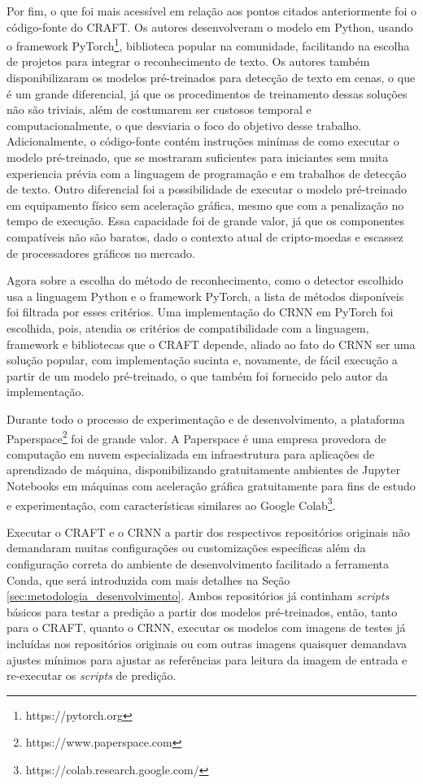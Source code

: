 Por fim, o que foi mais acessível em relação aos pontos citados anteriormente foi o código-fonte do CRAFT. Os autores desenvolveram o modelo em 
Python, usando o framework PyTorch\footnote{https://pytorch.org}, biblioteca popular na comunidade, facilitando na escolha de projetos para 
integrar o reconhecimento de texto. Os autores também disponibilizaram os modelos pré-treinados para detecção de texto em cenas, o que é um 
grande diferencial, já que os procedimentos de treinamento dessas soluções não são triviais, além de costumarem ser custosos temporal 
e computacionalmente, o que desviaria o foco do objetivo desse trabalho. Adicionalmente, o código-fonte contém instruções minímas de como executar 
o modelo pré-treinado, que se mostraram suficientes para iniciantes sem muita experiencia prévia com a linguagem de programação e em trabalhos 
de detecção de texto. Outro diferencial foi a possibilidade de executar o modelo pré-treinado em equipamento físico sem aceleração gráfica, mesmo 
que com a penalização no tempo de execução. Essa capacidade foi de grande valor, já que os componentes compatíveis não são baratos, dado o contexto 
atual de cripto-moedas e escassez de processadores gráficos no mercado.

Agora sobre a escolha do método de reconhecimento, como o detector escolhido usa a linguagem Python e o framework PyTorch, a lista de métodos 
disponíveis foi filtrada por esses critérios. Uma implementação do CRNN em PyTorch foi escolhida, pois, atendia os critérios de compatibilidade 
com a linguagem, framework e bibliotecas que o CRAFT depende, aliado ao fato do CRNN ser uma solução popular, com implementação sucinta e, 
novamente, de fácil execução a partir de um modelo pré-treinado, o que também foi fornecido pelo autor da implementação.

Durante todo o processo de experimentação e de desenvolvimento, a plataforma Paperspace\footnote{https://www.paperspace.com} foi de grande valor. 
A Paperspace é uma empresa provedora de computação em nuvem especializada em infraestrutura para aplicações de aprendizado de máquina, disponibilizando 
gratuitamente ambientes de Jupyter Notebooks em máquinas com aceleração gráfica gratuitamente para fins de estudo e experimentação, com características 
similares ao Google Colab\footnote{https://colab.research.google.com/}.

Executar o CRAFT e o CRNN a partir dos respectivos repositórios originais não demandaram muitas configurações ou customizações específicas além da 
configuração correta do ambiente de desenvolvimento facilitado a ferramenta Conda, que será introduzida com mais detalhes na Seção \ref{sec:metodologia_desenvolvimento}.
 Ambos repositórios já continham \textit{scripts} básicos para testar a predição a partir dos modelos pré-treinados, então, tanto para o CRAFT, 
 quanto o CRNN, executar os modelos com imagens de testes já incluídas nos repositórios originais ou com outras imagens quaisquer demandava ajustes 
 mínimos para ajustar as referências para leitura da imagem de entrada e re-executar os \textit{scripts} de predição.

